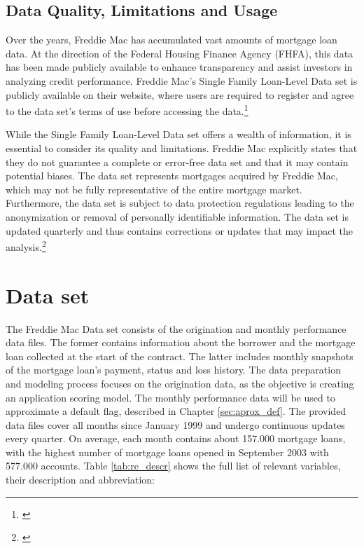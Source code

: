 \subsection{Data Quality, Limitations and Usage}

Over the years, Freddie Mac has accumulated vast amounts of mortgage loan data. At the direction of the Federal Housing Finance Agency (FHFA), this data has been made publicly available to enhance transparency and assist investors in analyzing credit performance. Freddie Mac's Single Family Loan-Level Data set is publicly available on their website, where users are required to register and agree to the data set's terms of use before accessing the data.\footnote{\cite{FreddieMacData:2023}}

While the Single Family Loan-Level Data set offers a wealth of information, it is essential to consider its quality and limitations. Freddie Mac explicitly states  that they do not guarantee a complete or error-free data set and that it may contain potential biases. The data set represents mortgages acquired by Freddie Mac, which may not be fully representative of the entire mortgage market. Furthermore, the data set is subject to data protection regulations leading to the anonymization or removal of personally identifiable information. The data set is updated quarterly and thus contains corrections or updates that may impact the analysis.\footnote{\cite{FreddieMacUG:2023}}


\section{Data set}

The Freddie Mac Data set consists of the origination and monthly performance data files. The former contains information about the borrower and the mortgage loan collected at the start of the contract. The latter includes monthly snapshots of the mortgage loan's payment, status and loss history. The data preparation and modeling process focuses on the origination data, as the objective is creating an application scoring model. The monthly performance data will be used to approximate a default flag, described in Chapter \ref{sec:aprox_def}. The provided data files cover all months since January 1999 and undergo continuous updates every quarter. On average, each month contains about 157.000 mortgage loans, with the highest number of mortgage loans opened in September 2003 with 577.000 accounts. Table \ref{tab:re_descr} shows the full list of relevant variables, their description and abbreviation:

